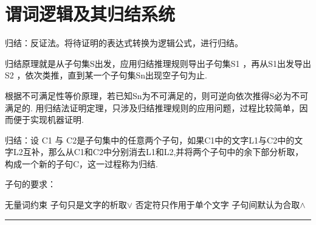 \documentclass[twocolumn,zihao=5,linespread=1,heading=false,autoindent=0pt]{ctexart}
\newcommand{\HRule}[1][\medskipamount]{\par
  \vspace*{\dimexpr-\parskip-\baselineskip+#1}
  \noindent\rule{\linewidth}{0.2mm}\par
  \vspace*{\dimexpr-\parskip-.5\baselineskip+#1}}
\theoremstyle{exampstyle} \newtheorem{definition}{定义}[section]
\theoremstyle{exampstyle} \newtheorem{example}{例}[section]
\theoremstyle{exampstyle} \newtheorem{theorem}{定理}[section]
\theoremstyle{exampstyle} \newtheorem{lemma}{引理}[section]
\theoremstyle{exampstyle} \newtheorem{myproof}{证明}[section]
\begin{document}
\section{谓词逻辑及其归结系统}

归结：反证法。将待证明的表达式转换为逻辑公式，进行归结。

归结原理就是从子句集S出发，应用归结推理规则导出子句集S1 ，再从S1出发导出S2 ，依次类推，直到某一个子句集Sn出现空子句为止.

根据不可满足性等价原理，若已知Sn为不可满足的，则可逆向依次推得S必为不可满足的.
用归结法证明定理，只涉及归结推理规则的应用问题，过程比较简单，因而便于实现机器证明. 

归结：设 C1 与 C2是子句集中的任意两个子句，如果C1中的文字L1与C2中的文字L2互补，那么从C1和C2中分别消去L1和L2,并将两个子句中的余下部分析取，构成一个新的子句C，这一过程称为归结.

\begin{multicols}{2}
    子句的要求：

\begin{outline}[citemize]
    \1 无量词约束
    \1 子句只是文字的析取$\lor$
    \1 否定符只作用于单个文字
    \1 子句间默认为合取$\land$
\end{outline}
\end{multicols}
\HRule
\end{document}

